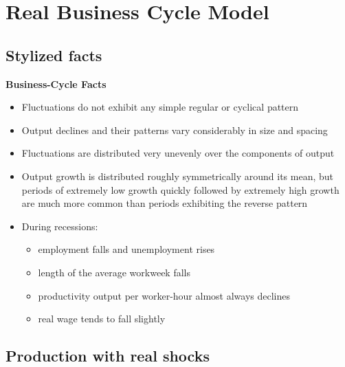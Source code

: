 \documentclass[../main.tex]{subfiles}
\begin{document}
    
    \chapter{Real Business Cycle Model}
    
    \section{Stylized facts}
    \textbf{Business-Cycle Facts}
    \begin{itemize}
    
        \item
        Fluctuations do not exhibit any simple regular or cyclical pattern
        
        \item
        Output declines and their patterns vary considerably in size and spacing
        
        \item
        Fluctuations are distributed very unevenly over the components of output
        
        \item
        Output growth is distributed roughly symmetrically around its mean, but periods of extremely low growth quickly followed by extremely high growth are much more common than periods exhibiting the reverse pattern
        
        \item
        During recessions:
            \begin{itemize}
            
                \item
                employment falls and unemployment rises
                
                \item
                length of the average workweek falls
                
                \item
                productivity output per worker-hour almost always declines
                
                \item
                real wage tends to fall slightly
                
            \end{itemize}
            
    \end{itemize}
    
    \section{Production with real shocks}
        
\end{document}
